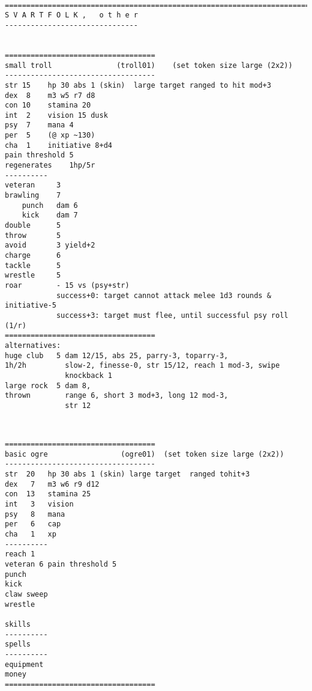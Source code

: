 \





\goodbreak
{}

\goodbreak \begin{samepage} \small \begin{verbatim}
================================================================================
S V A R T F O L K ,   o t h e r
-------------------------------


===================================
small troll               (troll01)    (set token size large (2x2))
-----------------------------------
str 15    hp 30 abs 1 (skin)  large target ranged to hit mod+3
dex  8    m3 w5 r7 d8
con 10    stamina 20
int  2    vision 15 dusk
psy  7    mana 4
per  5    (@ xp ~130)
cha  1    initiative 8+d4
pain threshold 5
regenerates    1hp/5r
----------
veteran     3
brawling    7
    punch   dam 6
    kick    dam 7
double      5
throw       5
avoid       3 yield+2
charge      6
tackle      5
wrestle     5
roar        - 15 vs (psy+str)
            success+0: target cannot attack melee 1d3 rounds & initiative-5
            success+3: target must flee, until successful psy roll (1/r)
===================================
alternatives:
huge club   5 dam 12/15, abs 25, parry-3, toparry-3,
1h/2h         slow-2, finesse-0, str 15/12, reach 1 mod-3, swipe
              knockback 1
large rock  5 dam 8,
thrown        range 6, short 3 mod+3, long 12 mod-3,
              str 12
\end{verbatim} \normalsize \end{samepage}

\

\goodbreak \begin{samepage} \small \begin{verbatim}
===================================
basic ogre                 (ogre01)  (set token size large (2x2))
-----------------------------------
str  20   hp 30 abs 1 (skin) large target  ranged tohit+3
dex   7   m3 w6 r9 d12
con  13   stamina 25
int   3   vision
psy   8   mana
per   6   cap
cha   1   xp
----------
reach 1
veteran 6 pain threshold 5
punch
kick
claw sweep
wrestle

skills
----------
spells
----------
equipment
money
===================================
\end{verbatim} \normalsize \end{samepage}

